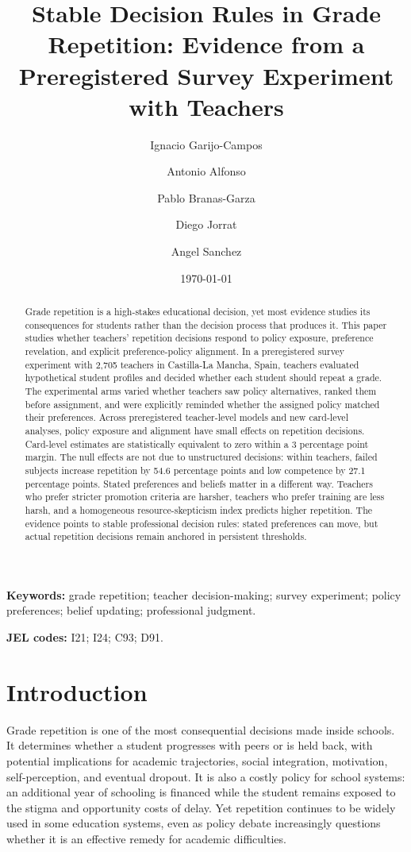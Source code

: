 \documentclass[12pt,a4paper]{article}
\title{Stable Decision Rules in Grade Repetition: Evidence from a Preregistered Survey Experiment with Teachers}
\author{
Ignacio Garijo-Campos \and
Antonio Alfonso \and
Pablo Branas-Garza \and
Diego Jorrat \and
Angel Sanchez
}
\date{\today}
\begin{document}
\maketitle

\begin{abstract}
\noindent Grade repetition is a high-stakes educational decision, yet most evidence studies its consequences for students rather than the decision process that produces it. This paper studies whether teachers' repetition decisions respond to policy exposure, preference revelation, and explicit preference-policy alignment. In a preregistered survey experiment with 2,705 teachers in Castilla-La Mancha, Spain, teachers evaluated hypothetical student profiles and decided whether each student should repeat a grade. The experimental arms varied whether teachers saw policy alternatives, ranked them before assignment, and were explicitly reminded whether the assigned policy matched their preferences. Across preregistered teacher-level models and new card-level analyses, policy exposure and alignment have small effects on repetition decisions. Card-level estimates are statistically equivalent to zero within a 3 percentage point margin. The null effects are not due to unstructured decisions: within teachers, failed subjects increase repetition by 54.6 percentage points and low competence by 27.1 percentage points. Stated preferences and beliefs matter in a different way. Teachers who prefer stricter promotion criteria are harsher, teachers who prefer training are less harsh, and a homogeneous resource-skepticism index predicts higher repetition. The evidence points to stable professional decision rules: stated preferences can move, but actual repetition decisions remain anchored in persistent thresholds.
\end{abstract}

\noindent\textbf{Keywords:} grade repetition; teacher decision-making; survey experiment; policy preferences; belief updating; professional judgment.

\noindent\textbf{JEL codes:} I21; I24; C93; D91.

\section{Introduction}

Grade repetition is one of the most consequential decisions made inside schools. It determines whether a student progresses with peers or is held back, with potential implications for academic trajectories, social integration, motivation, self-perception, and eventual dropout. It is also a costly policy for school systems: an additional year of schooling is financed while the student remains exposed to the stigma and opportunity costs of delay. Yet repetition continues to be widely used in some education systems, even as policy debate increasingly questions whether it is an effective remedy for academic difficulties.
\end{document}
